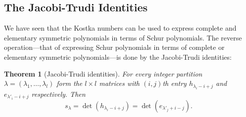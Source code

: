 \documentclass[11pt]{amsproc}
\newtheorem{theorem}{Theorem}[subsection]
\theoremstyle{definition}
\theoremstyle{example}
\begin{document}
\subsection{The Jacobi-Trudi Identities}
\label{sec:jacobi-trudi-ident}
We have seen that the Kostka numbers can be used to express complete and elementary symmetric polynomials in terms of Schur polynomials.
The reverse operation---that of expressing Schur polynomials in terms of complete or elementary symmetric polynomials---is done by the Jacobi-Trudi identities:
\begin{theorem}
  [Jacobi-Trudi identities]
  For every integer partition $\lambda=(\lambda_1,\dotsc,\lambda_l)$ form the $l\times l$ matrices with $(i,j)$th entry $h_{\lambda_i-i+j}$ and $e_{\lambda'_i-i+j}$ respectively.
  Then
  \begin{displaymath}
    s_\lambda = \det(h_{\lambda_i-i+j})= \det(e_{\lambda'_j+i-j}).
  \end{displaymath}
\end{theorem}
\end{document}
